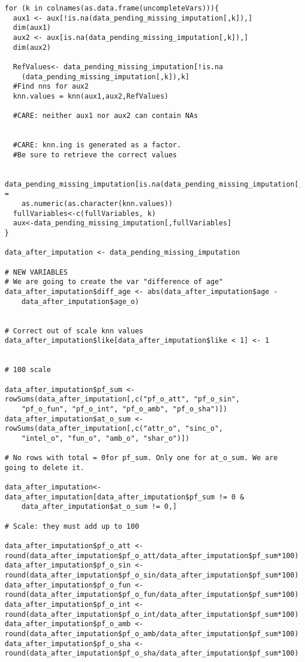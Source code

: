 \begin{verbatim}
for (k in colnames(as.data.frame(uncompleteVars))){
  aux1 <- aux[!is.na(data_pending_missing_imputation[,k]),]
  dim(aux1) 
  aux2 <- aux[is.na(data_pending_missing_imputation[,k]),]
  dim(aux2)
  
  RefValues<- data_pending_missing_imputation[!is.na
    (data_pending_missing_imputation[,k]),k]
  #Find nns for aux2
  knn.values = knn(aux1,aux2,RefValues)   
  
  #CARE: neither aux1 nor aux2 can contain NAs
  
  
  #CARE: knn.ing is generated as a factor. 
  #Be sure to retrieve the correct values
  
  data_pending_missing_imputation[is.na(data_pending_missing_imputation[,k]),k] =
    as.numeric(as.character(knn.values))
  fullVariables<-c(fullVariables, k)
  aux<-data_pending_missing_imputation[,fullVariables]
}

data_after_imputation <- data_pending_missing_imputation

# NEW VARIABLES
# We are going to create the var "difference of age"
data_after_imputation$diff_age <- abs(data_after_imputation$age - 
    data_after_imputation$age_o)


# Correct out of scale knn values
data_after_imputation$like[data_after_imputation$like < 1] <- 1


# 100 scale

data_after_imputation$pf_sum <- rowSums(data_after_imputation[,c("pf_o_att", "pf_o_sin",
    "pf_o_fun", "pf_o_int", "pf_o_amb", "pf_o_sha")])
data_after_imputation$at_o_sum <- rowSums(data_after_imputation[,c("attr_o", "sinc_o",
    "intel_o", "fun_o", "amb_o", "shar_o")])

# No rows with total = 0for pf_sum. Only one for at_o_sum. We are going to delete it.

data_after_imputation<-data_after_imputation[data_after_imputation$pf_sum != 0 & 
    data_after_imputation$at_o_sum != 0,]

# Scale: they must add up to 100

data_after_imputation$pf_o_att <-
round(data_after_imputation$pf_o_att/data_after_imputation$pf_sum*100)
data_after_imputation$pf_o_sin <-
round(data_after_imputation$pf_o_sin/data_after_imputation$pf_sum*100)
data_after_imputation$pf_o_fun <-
round(data_after_imputation$pf_o_fun/data_after_imputation$pf_sum*100)
data_after_imputation$pf_o_int <-
round(data_after_imputation$pf_o_int/data_after_imputation$pf_sum*100)
data_after_imputation$pf_o_amb <-
round(data_after_imputation$pf_o_amb/data_after_imputation$pf_sum*100)
data_after_imputation$pf_o_sha <-
round(data_after_imputation$pf_o_sha/data_after_imputation$pf_sum*100)


\end{verbatim}

